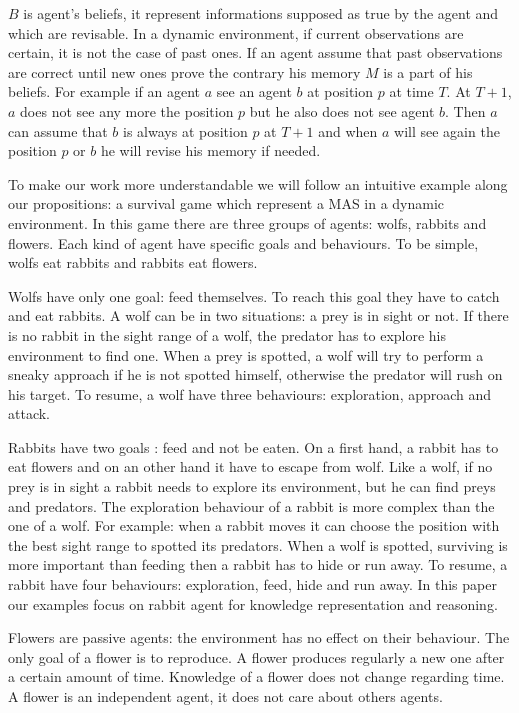 \documentclass{aamas2012}
\begin{document}
	$B$ is agent's beliefs, it represent informations supposed as true by the agent and which are revisable.
	In a dynamic environment, if current observations are certain, it is not the case of past ones.
	If an agent assume that past observations are correct until new ones prove the contrary his memory $M$ is a part of his beliefs.
	For example if an agent $a$ see an agent $b$ at position $p$ at time $T$.
	At $T+1$, $a$ does not see any more the position $p$ but he also does not see agent $b$.
	Then $a$ can assume that $b$ is always at position $p$ at $T+1$ and when $a$ will see again the position $p$ or $b$ he will revise his memory if needed.
	
	To make our work more understandable we will follow an intuitive example along our propositions: a survival game which represent a MAS in a dynamic environment.
	In this game there are three groups of agents: wolfs, rabbits and flowers.
	Each kind of agent have specific goals and behaviours.
	To be simple, wolfs eat rabbits and rabbits eat flowers.
	
	Wolfs have only one goal: feed themselves.
	To reach this goal they have to catch and eat rabbits.
	A wolf can be in two situations: a prey is in sight or not.
	If there is no rabbit in the sight range of a wolf, the predator has to explore his environment to find one.
	When a prey is spotted, a wolf will try to perform a sneaky approach if he is not spotted himself, otherwise the predator will rush on his target.
	To resume, a wolf have three behaviours: exploration, approach and attack.
	
	Rabbits have two goals : feed and not be eaten.
	On a first hand, a rabbit has to eat flowers and on an other hand it have to escape from wolf.
	Like a wolf, if no prey is in sight a rabbit needs to explore its environment, but he can find preys and predators.
	The exploration behaviour of a rabbit is more complex than the one of a wolf.
	For example: when a rabbit moves it can choose the position with the best sight range to spotted its predators.
	When a wolf is spotted, surviving is more important than feeding then a rabbit has to hide or run away.
	To resume, a rabbit have four behaviours: exploration, feed, hide and run away.
	In this paper our examples focus on rabbit agent for knowledge representation and reasoning.
	
	Flowers are passive agents: the environment has no effect on their behaviour.
	The only goal of a flower is to reproduce.
	A flower produces regularly a new one after a certain amount of time.
	Knowledge of a flower does not change regarding time.
	A flower is an independent agent, it does not care about others agents.
\end{document}
